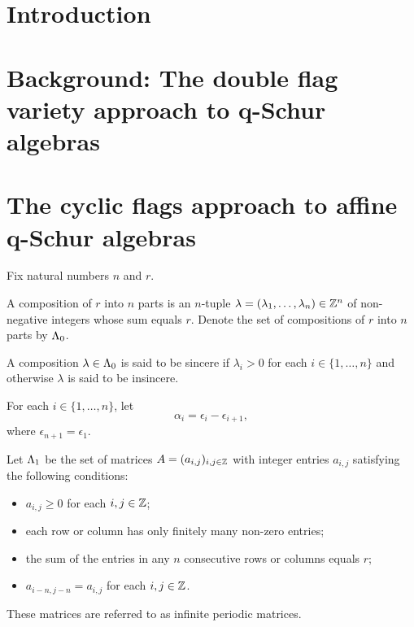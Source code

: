 \documentclass[a4paper, 11pt]{report}
\begin{document}
\maketitle
\tableofcontents

\chapter{Introduction}


\chapter{Background: The double flag variety approach to q-Schur algebras}


\chapter{The cyclic flags approach to affine q-Schur algebras}

Fix natural numbers $n$ and $r$.

\begin{definition}[compositions]\label{def:compositions}
A composition of $r$ into $n$ parts is an $n$-tuple $\lambda=(\lambda_1,\ldots,\lambda_n)\in\mathbb{Z}^n$ of non-negative integers whose sum equals $r$. Denote the set of compositions of $r$ into $n$ parts by $\Lambda_0{}$.
\end{definition}

A composition $\lambda\in\Lambda_0{}$ is said to be sincere if $\lambda_i>0$ for each $i\in\{1,\ldots,n\}$ and otherwise $\lambda$ is said to be insincere.

For each $i\in\{1,\ldots,n\}$, let
\begin{equation*}
\alpha_i = \epsilon_i - \epsilon_{i+1},
\end{equation*}
where $\epsilon_{n+1}=\epsilon_1$.

\begin{definition}\label{def:matrices}
Let $\Lambda_1{}$ be the set of matrices $A=(a_{i,j})_{i,j\in\mathbb{Z}}$ with integer entries $a_{i,j}$ satisfying the following conditions: 
\begin{itemize}
\item
$a_{i,j}\geq 0$ for each $i,j\in\mathbb{Z}$;
\item
each row or column has only finitely many non-zero entries;
\item
the sum of the entries in any $n$ consecutive rows or columns equals $r$;
\item
$a_{i-n,j-n}=a_{i,j}$ for each $i,j\in\mathbb{Z}$.
\end{itemize}
These matrices are referred to as infinite periodic matrices.
\end{definition}
\end{document}
